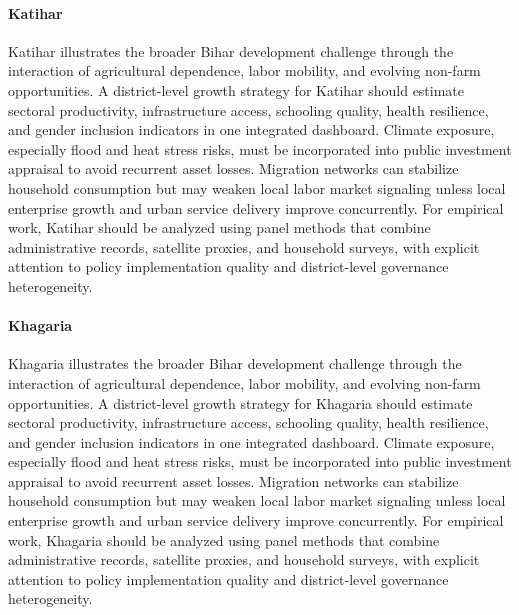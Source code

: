 \documentclass[preprint,12pt]{elsarticle}
\begin{document}
\paragraph{Katihar} Katihar illustrates the broader Bihar development challenge through the interaction of agricultural dependence, labor mobility, and evolving non-farm opportunities. A district-level growth strategy for Katihar should estimate sectoral productivity, infrastructure access, schooling quality, health resilience, and gender inclusion indicators in one integrated dashboard. Climate exposure, especially flood and heat stress risks, must be incorporated into public investment appraisal to avoid recurrent asset losses. Migration networks can stabilize household consumption but may weaken local labor market signaling unless local enterprise growth and urban service delivery improve concurrently. For empirical work, Katihar should be analyzed using panel methods that combine administrative records, satellite proxies, and household surveys, with explicit attention to policy implementation quality and district-level governance heterogeneity.

\paragraph{Khagaria} Khagaria illustrates the broader Bihar development challenge through the interaction of agricultural dependence, labor mobility, and evolving non-farm opportunities. A district-level growth strategy for Khagaria should estimate sectoral productivity, infrastructure access, schooling quality, health resilience, and gender inclusion indicators in one integrated dashboard. Climate exposure, especially flood and heat stress risks, must be incorporated into public investment appraisal to avoid recurrent asset losses. Migration networks can stabilize household consumption but may weaken local labor market signaling unless local enterprise growth and urban service delivery improve concurrently. For empirical work, Khagaria should be analyzed using panel methods that combine administrative records, satellite proxies, and household surveys, with explicit attention to policy implementation quality and district-level governance heterogeneity.
\end{document}
